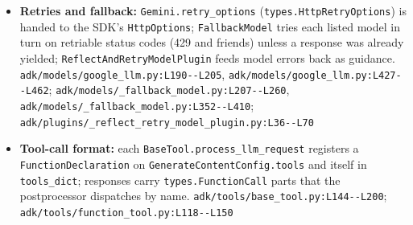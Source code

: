 \begin{itemize}
\item \textbf{Retries and fallback:} \texttt{Gemini.\allowbreak{}retry\_\allowbreak{}options} (\texttt{types.\allowbreak{}HttpRetryOptions}) is handed to the SDK's \texttt{HttpOptions}; \texttt{FallbackModel} tries each listed model in turn on retriable status codes (429 and friends) unless a response was already yielded; \texttt{ReflectAndRetryModelPlugin} feeds model errors back as guidance. \texttt{adk/\allowbreak{}models/\allowbreak{}google\_\allowbreak{}llm.\allowbreak{}py:\allowbreak{}L190-\allowbreak{}-\allowbreak{}L205}, \texttt{adk/\allowbreak{}models/\allowbreak{}google\_\allowbreak{}llm.\allowbreak{}py:\allowbreak{}L427-\allowbreak{}-\allowbreak{}L462}; \texttt{adk/\allowbreak{}models/\allowbreak{}\_\allowbreak{}fallback\_\allowbreak{}model.\allowbreak{}py:\allowbreak{}L207-\allowbreak{}-\allowbreak{}L260}, \texttt{adk/\allowbreak{}models/\allowbreak{}\_\allowbreak{}fallback\_\allowbreak{}model.\allowbreak{}py:\allowbreak{}L352-\allowbreak{}-\allowbreak{}L410}; \texttt{adk/\allowbreak{}plugins/\allowbreak{}\_\allowbreak{}reflect\_\allowbreak{}retry\_\allowbreak{}model\_\allowbreak{}plugin.\allowbreak{}py:\allowbreak{}L36-\allowbreak{}-\allowbreak{}L70}
\item \textbf{Tool-call format:} each \texttt{BaseTool.\allowbreak{}process\_\allowbreak{}llm\_\allowbreak{}request} registers a \texttt{FunctionDeclaration} on \texttt{GenerateContentConfig.\allowbreak{}tools} and itself in \texttt{tools\_\allowbreak{}dict}; responses carry \texttt{types.\allowbreak{}FunctionCall} parts that the postprocessor dispatches by name. \texttt{adk/\allowbreak{}tools/\allowbreak{}base\_\allowbreak{}tool.\allowbreak{}py:\allowbreak{}L144-\allowbreak{}-\allowbreak{}L200}; \texttt{adk/\allowbreak{}tools/\allowbreak{}function\_\allowbreak{}tool.\allowbreak{}py:\allowbreak{}L118-\allowbreak{}-\allowbreak{}L150}
\end{itemize}


